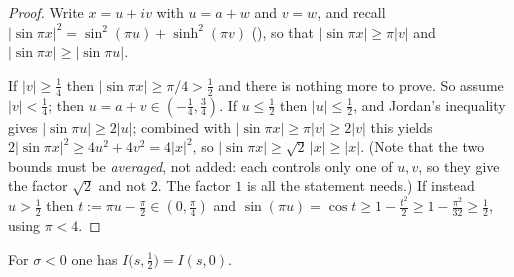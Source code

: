 \begin{proof}
\leanok
Write $x=u+iv$ with $u=a+w$ and $v=w$, and recall
$\lvert\sin\pi x\rvert^{2}=\sin^{2}(\pi u)+\sinh^{2}(\pi v)$ (), so that
$\lvert\sin\pi x\rvert\ge\pi\lvert v\rvert$ and $\lvert\sin\pi x\rvert\ge\lvert\sin\pi u\rvert$.

If $\lvert v\rvert\ge\tfrac14$ then $\lvert\sin\pi x\rvert\ge\pi/4>\tfrac12$ and there is nothing
more to prove.  So assume $\lvert v\rvert<\tfrac14$; then $u=a+v\in(-\tfrac14,\tfrac34)$.  If
$u\le\tfrac12$ then $\lvert u\rvert\le\tfrac12$, and Jordan's inequality gives
$\lvert\sin\pi u\rvert\ge2\lvert u\rvert$; combined with
$\lvert\sin\pi x\rvert\ge\pi\lvert v\rvert\ge2\lvert v\rvert$ this yields
$2\lvert\sin\pi x\rvert^{2}\ge4u^{2}+4v^{2}=4\lvert x\rvert^{2}$, so
$\lvert\sin\pi x\rvert\ge\sqrt2\,\lvert x\rvert\ge\lvert x\rvert$.  (Note that the two bounds must
be \emph{averaged}, not added: each controls only one of $u,v$, so they give the factor $\sqrt2$
and not $2$.  The factor $1$ is all the statement needs.)
If instead $u>\tfrac12$ then $t:=\pi u-\tfrac\pi2\in(0,\tfrac\pi4)$ and
$\sin(\pi u)=\cos t\ge1-\tfrac{t^{2}}2\ge1-\tfrac{\pi^{2}}{32}\ge\tfrac12$, using $\pi<4$.
\end{proof}

\begin{lemma}
\label{lem:rsz_deform}
\leanok
{}
For $\sigma<0$ one has $I\bigl(s,\tfrac12\bigr)=I(s,0)$.
\end{lemma}

